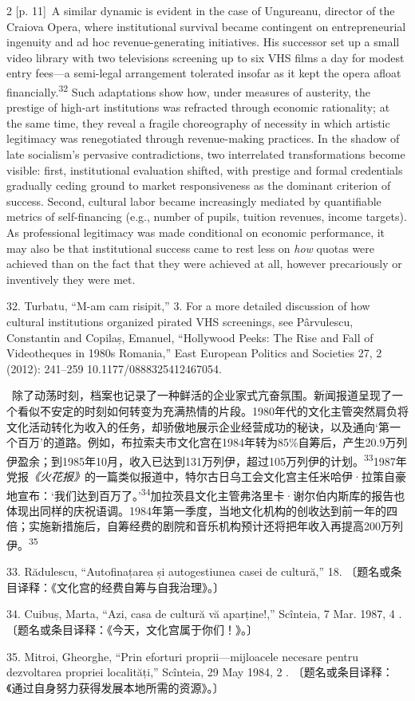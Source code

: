 \documentclass[10pt,a4paper]{article}
\begin{document}
\begin{paracol}{2}
{\scriptsize\color{gray} [p. 11]}\ A similar dynamic is evident in the case of Ungureanu, director of the Craiova Opera, where institutional survival became contingent on entrepreneurial ingenuity and ad hoc revenue-generating initiatives. His successor set up a small video library with two televisions screening up to six VHS films a day for modest entry fees—a semi-legal arrangement tolerated insofar as it kept the opera afloat financially.\nobreak\textsuperscript{32} Such adaptations show how, under measures of austerity, the prestige of high-art institutions was refracted through economic rationality; at the same time, they reveal a fragile choreography of necessity in which artistic legitimacy was renegotiated through revenue-making practices. In the shadow of late socialism’s pervasive contradictions, two interrelated transformations become visible: first, institutional evaluation shifted, with prestige and formal credentials gradually ceding ground to market responsiveness as the dominant criterion of success. Second, cultural labor became increasingly mediated by quantifiable metrics of self-financing (e.g., number of pupils, tuition revenues, income targets). As professional legitimacy was made conditional on economic performance, it may also be that institutional success came to rest less on \textit{how} quotas were achieved than on the fact that they were achieved at all, however precariously or inventively they were met.\par{\small 32. Turbatu, “M-am cam risipit,” 3. For a more detailed discussion of how cultural institutions organized pirated VHS screenings, see Pârvulescu, Constantin and Copilaș, Emanuel, “Hollywood Peeks: The Rise and Fall of Videotheques in 1980s Romania,” East European Politics and Societies 27, 2 (2012): 241–259 10.1177/0888325412467054.\par}
\switchcolumn*
{\scriptsize\color{gray} [p. 12]}\ 除了动荡时刻，档案也记录了一种鲜活的企业家式亢奋氛围。新闻报道呈现了一个看似不安定的时刻如何转变为充满热情的片段。1980年代的文化主管突然肩负将文化活动转化为收入的任务，却骄傲地展示企业经营成功的秘诀，以及通向‘第一个百万’的道路。例如，布拉索夫市文化宫在1984年转为85\%自筹后，产生20.9万列伊盈余；到1985年10月，收入已达到131万列伊，超过105万列伊的计\mbox{划。\textsuperscript{33}}1987年党报\textit{《火花报》}的一篇类似报道中，特尔古日乌工会文化宫主任米哈伊·拉策自豪地宣布：‘我们达到百万了。’\nobreak\textsuperscript{34}加拉茨县文化主管弗洛里卡·谢尔伯内斯库的报告也体现出同样的庆祝语调。1984年第一季度，当地文化机构的创收达到前一年的四倍；实施新措施后，自筹经费的剧院和音乐机构预计还将把年收入再提高200万列\mbox{伊。\textsuperscript{35}}\par{\small 33. Rădulescu, “Autofinațarea și autogestiunea casei de cultură,” 18. 〔题名或条目译释：《文化宫的经费自筹与自我治理》。〕\par}{\small 34. Cuibuș, Marta, “Azi, casa de cultură vă aparține!,” Scînteia, 7 Mar. 1987, 4 . 〔题名或条目译释：《今天，文化宫属于你们！》。〕\par}{\small 35. Mitroi, Gheorghe, “Prin eforturi proprii—mijloacele necesare pentru dezvoltarea propriei localități,” Scînteia, 29 May 1984, 2 . 〔题名或条目译释：《通过自身努力获得发展本地所需的资源》。〕\par}

\end{paracol}
\end{document}
